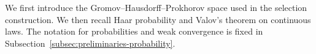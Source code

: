 We first introduce the Gromov--Hausdorff--Prokhorov space used in the
selection construction.
We then recall Haar probability and Valov's theorem on continuous laws.
The notation for probabilities and weak convergence is fixed in
Subsection~\ref{subsec:preliminaries-probability}.
